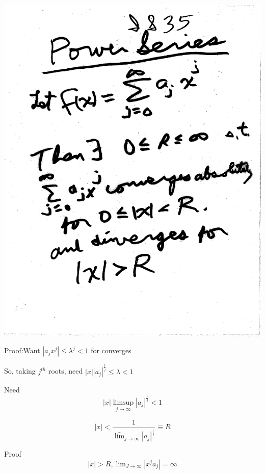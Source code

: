 \documentclass[10pt,a4paper]{article}
\begin{document}
{{\includegraphics[scale=.42]{Pages/IS_35}

\newpage 

Proof:Want 
$|a_jx^j| \leq \lambda^j <1$ for converges 

So, taking $j^{th}$ roots,
need $|x| |a_j|^{\frac{1}{j}} \leq \lambda <1$ 

Need $$|x| \limsup_{j\rightarrow\infty} |a_j|^{\frac{1}{j}} <1$$

$$|x| < \frac{1}{\bar{\lim}_{j \rightarrow \infty} |a_j|^{\frac{1}{j}}} \equiv R$$

Proof $$|x|>R, \bar{\lim}_{J\rightarrow\infty}|x^ja_j|=\infty$$

}}
\end{document}
